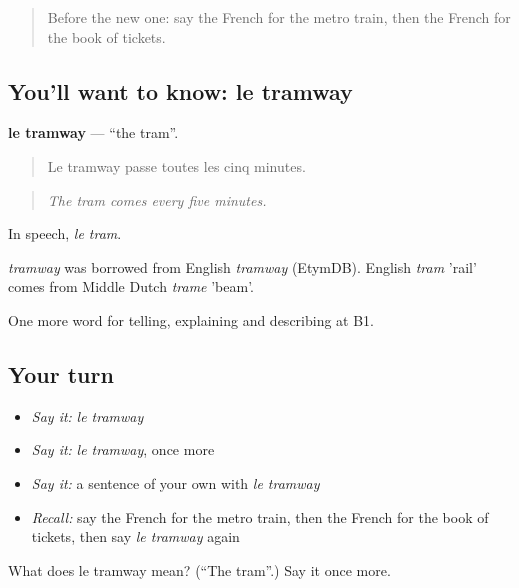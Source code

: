 \label{lesson:FR-C415-tramway}



\begin{quote}
Before the new one: say the French for the metro train, then the French for the book of tickets.
\end{quote}

\subsection*{You'll want to know: le tramway}
\textbf{le tramway} — \textquotedblleft{}the tram\textquotedblright{}.

\begin{quote}
Le tramway passe toutes les cinq minutes.
\end{quote}

\begin{quote}
\emph{The tram comes every five minutes.}
\end{quote}

In speech, \emph{le tram}.

\begin{cousinweb}
\emph{tramway} was borrowed from English \emph{tramway} (EtymDB). English \emph{tram} 'rail' comes from Middle Dutch \emph{trame} 'beam'.
\end{cousinweb}

\begin{grammarlens}[title={What you've built}]
One more word for telling, explaining and describing at B1.
\end{grammarlens}

\subsection*{Your turn}
\begin{itemize}
\raggedright
  \item \emph{Say it:} \emph{le tramway}
  \item \emph{Say it:} \emph{le tramway}, once more
  \item \emph{Say it:} a sentence of your own with \emph{le tramway}
  \item \emph{Recall:} say the French for the metro train, then the French for the book of tickets, then say \emph{le tramway} again
\end{itemize}

\begin{tcolorbox}[breakable,colback=teal!4,colframe=teal!35!black,title={Before you move on}]
What does le tramway mean? (\textquotedblleft{}The tram\textquotedblright{}.) Say it once more.
\end{tcolorbox}
